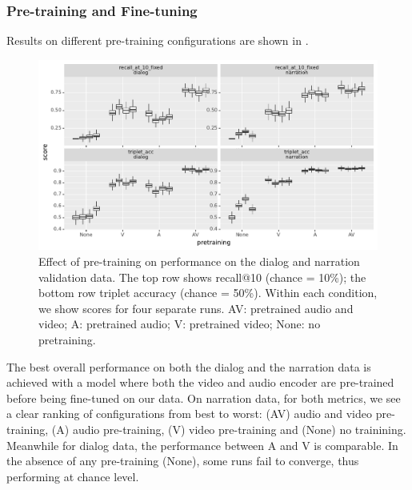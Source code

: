 \subsubsection{Pre-training and Fine-tuning}
Results on different pre-training configurations are shown in
.
\begin{figure}[htb]
	\centering
	\includegraphics[width=\textwidth]{results/ablations/pretraining.pdf}
	\caption{Effect of pre-training on performance on the dialog
          and narration validation data. The top row shows recall@10
          (chance = 10\%); the bottom row triplet accuracy (chance =
          50\%). Within each condition, we show scores for four
          separate runs. AV: pretrained audio and video; A: pretrained
          audio; V: pretrained video; None: no pretraining.}
	\label{fig:pretraining}
      \end{figure}

The best overall performance on both the dialog and the narration data is 
achieved with a model where both the video and audio encoder are pre-trained 
before being fine-tuned on our data. On narration data, for both metrics,
we see a clear ranking of
configurations from best to worst: (AV) audio and video pre-training,
(A) audio pre-training, (V) video pre-training and (None) no
trainining. Meanwhile for dialog data, the performance between A and V
is comparable. In the absence of any pre-training (None),
some runs fail to converge, thus performing at chance level.

